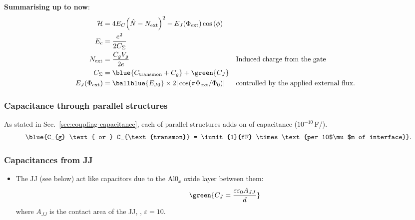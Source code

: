 \newpage
\begin{framed}\noindent
  \textbf{Summarising up to now}:
  \begin{equation}\label{eq:cooper-pair-box-summary}
    \begin{aligned}
      \mathcal{H} & = 4E_C{\left(\hat{N}-N_\text{ext}\right)^2} -
      E_J(\Phi_{\text{ext}})\cos\left(\phi\right)\\
      E_c& = \frac{e^2}{2C_\Sigma}\\
      N_\text{ext} & = \frac{C_g V_g}{2e} && \text{Induced charge from the gate}\\
      C_{\Sigma} & = \blue{C_\text{transmon} + C_g}+ \green{C_J}\\
      E_J(\Phi_{\text{ext}}) & = \ballblue{E_{J0}} \times 2|\cos(\pi\Phi_\text{ext}/\Phi_0)| && \text{controlled by the applied external flux}.\\
    \end{aligned}
  \end{equation}

  \subsubsection{Capacitance through parallel structures}
  \label{sec:capac-thro-parall}
  As     stated     in     Sec.~\ref{sec:coupling-capacitance},     each
    of parallel  structures adds  on   of
  capacitance ($10^{-10}\,$F/\mum).
  \begin{equation}
    \blue{C_{g} \text{ or } C_{\text{transmon}} = \iunit{1}{fF} \times \text{per 10$\mu$m of interface}}.
  \end{equation}

\begin{center}
\end{center}

\subsubsection{Capacitances from JJ}
\label{sec:capacitances-from-jj}
\begin{itemize}
\item The  JJ (see below) act  like capacitors due to  the Al0$_x$ oxide
  layer between them:
  \begin{equation}
    \green{C_J = \frac{\varepsilon\varepsilon_0A_{JJ}}{d}}
  \end{equation}
  \noindent   where  $A_{JJ}$   is   the  contact   area   of  the   JJ,
  , $\varepsilon = 10$.


\end{itemize}
\end{framed}
